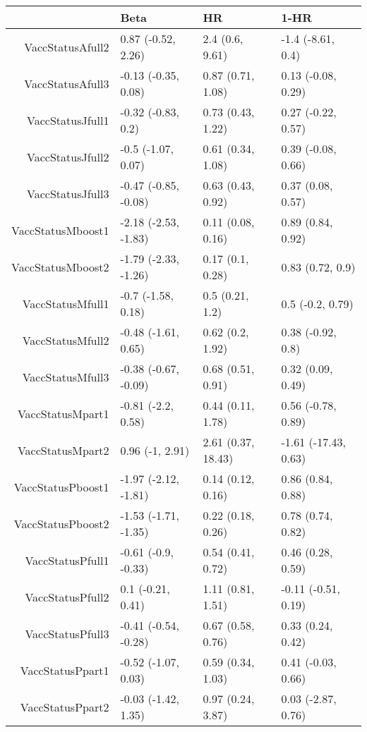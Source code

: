 \begin{table}[ht]
\centering
\begin{tabular}{rlll}
  \hline
 & Beta & HR & 1-HR \\ 
  \hline
VaccStatusAfull2 & 0.87 (-0.52, 2.26) & 2.4 (0.6, 9.61) & -1.4 (-8.61, 0.4) \\ 
  VaccStatusAfull3 & -0.13 (-0.35, 0.08) & 0.87 (0.71, 1.08) & 0.13 (-0.08, 0.29) \\ 
  VaccStatusJfull1 & -0.32 (-0.83, 0.2) & 0.73 (0.43, 1.22) & 0.27 (-0.22, 0.57) \\ 
  VaccStatusJfull2 & -0.5 (-1.07, 0.07) & 0.61 (0.34, 1.08) & 0.39 (-0.08, 0.66) \\ 
  VaccStatusJfull3 & -0.47 (-0.85, -0.08) & 0.63 (0.43, 0.92) & 0.37 (0.08, 0.57) \\ 
  VaccStatusMboost1 & -2.18 (-2.53, -1.83) & 0.11 (0.08, 0.16) & 0.89 (0.84, 0.92) \\ 
  VaccStatusMboost2 & -1.79 (-2.33, -1.26) & 0.17 (0.1, 0.28) & 0.83 (0.72, 0.9) \\ 
  VaccStatusMfull1 & -0.7 (-1.58, 0.18) & 0.5 (0.21, 1.2) & 0.5 (-0.2, 0.79) \\ 
  VaccStatusMfull2 & -0.48 (-1.61, 0.65) & 0.62 (0.2, 1.92) & 0.38 (-0.92, 0.8) \\ 
  VaccStatusMfull3 & -0.38 (-0.67, -0.09) & 0.68 (0.51, 0.91) & 0.32 (0.09, 0.49) \\ 
  VaccStatusMpart1 & -0.81 (-2.2, 0.58) & 0.44 (0.11, 1.78) & 0.56 (-0.78, 0.89) \\ 
  VaccStatusMpart2 & 0.96 (-1, 2.91) & 2.61 (0.37, 18.43) & -1.61 (-17.43, 0.63) \\ 
  VaccStatusPboost1 & -1.97 (-2.12, -1.81) & 0.14 (0.12, 0.16) & 0.86 (0.84, 0.88) \\ 
  VaccStatusPboost2 & -1.53 (-1.71, -1.35) & 0.22 (0.18, 0.26) & 0.78 (0.74, 0.82) \\ 
  VaccStatusPfull1 & -0.61 (-0.9, -0.33) & 0.54 (0.41, 0.72) & 0.46 (0.28, 0.59) \\ 
  VaccStatusPfull2 & 0.1 (-0.21, 0.41) & 1.11 (0.81, 1.51) & -0.11 (-0.51, 0.19) \\ 
  VaccStatusPfull3 & -0.41 (-0.54, -0.28) & 0.67 (0.58, 0.76) & 0.33 (0.24, 0.42) \\ 
  VaccStatusPpart1 & -0.52 (-1.07, 0.03) & 0.59 (0.34, 1.03) & 0.41 (-0.03, 0.66) \\ 
  VaccStatusPpart2 & -0.03 (-1.42, 1.35) & 0.97 (0.24, 3.87) & 0.03 (-2.87, 0.76) \\ 

\end{tabular}
\end{table}
